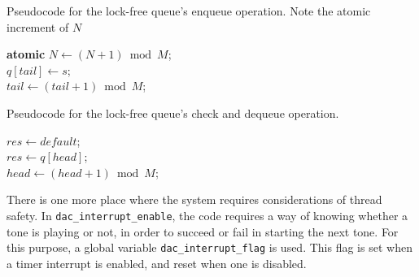 \documentclass[11pt,a4paper,twocolumn]{scrartcl}
\begin{document}
\begin{algorithm}
   \caption{Pseudocode for the lock-free queue's enqueue operation. Note the atomic increment of $N$}\label{alg:enqueue}
      \textbf{atomic} $N \gets (N + 1) \bmod M$; \\
      $q[tail] \gets s$; \\
      $tail \gets (tail + 1) \bmod M$;
\end{algorithm}

\begin{algorithm}
   \caption{Pseudocode for the lock-free queue's check and dequeue operation.}\label{alg:check_dequeue}
      $res \gets default$;\\
      {
         $res \gets q[head]$;\\
         $head \gets (head + 1) \bmod M$;
      }
\end{algorithm}

There is one more place where the system requires considerations of thread safety. In \verb!dac_interrupt_enable!, the code requires a way of knowing whether a tone is playing or not, in order to succeed or fail in starting the next tone. For this purpose, a global variable \verb!dac_interrupt_flag! is used. This flag is set when a timer interrupt is enabled, and reset when one is disabled.
\end{document}
